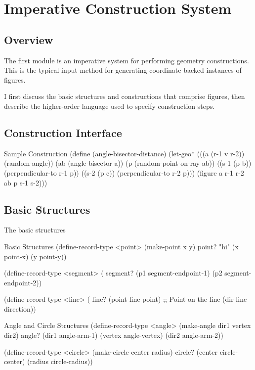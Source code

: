 \chapter{Imperative Construction System}
\label{chap:imperative}

\section{Overview}

The first module is an imperative system for performing geometry
constructions. This is the typical input method for generating
coordinate-backed instances of figures.

I first discuss the basic structures and constructions that comprise figures,
then describe the higher-order language used to specify construction
steps.

\section{Construction Interface}

\begin{code-example}{Sample Construction}
(define (angle-bisector-distance)
  (let-geo* (((a (r-1 v r-2)) (random-angle))
             (ab (angle-bisector a))
             (p (random-point-on-ray ab))
             ((s-1 (p b)) (perpendicular-to r-1 p))
             ((s-2 (p c)) (perpendicular-to r-2 p)))
     (figure a r-1 r-2 ab p s-1 s-2)))
\end{code-example}

\section{Basic Structures}

The basic structures

\begin{code-example}{Basic Structures}
(define-record-type <point>
  (make-point x y)
  point? "hi"
  (x point-x)
  (y point-y))

(define-record-type <segment>
  (%
  segment?
  (p1 segment-endpoint-1)
  (p2 segment-endpoint-2))

(define-record-type <line>
  (%
  line?
  (point line-point) ;; Point on the line
  (dir line-direction))
\end{code-example}

\begin{code-example}{Angle and Circle Structures}
(define-record-type <angle>
  (make-angle dir1 vertex dir2)
  angle?
  (dir1 angle-arm-1)
  (vertex angle-vertex)
  (dir2 angle-arm-2))

(define-record-type <circle>
  (make-circle center radius)
  circle?
  (center circle-center)
  (radius circle-radius))
\end{code-example}

